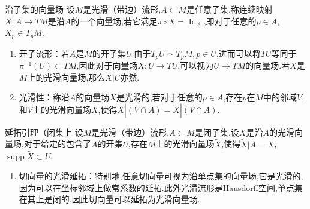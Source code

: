\documentclass[../../几何与拓扑.tex]{subfiles}
\begin{document}
\begin{definition}{沿子集的向量场}
    设$M$是光滑（带边）流形,$A\subset M$是任意子集.称连续映射$X:A\to TM$是沿$A$的一个向量场,若它满足$\pi \circ X=\operatorname{Id}_{A}$,即对于任意的$p \in A$,$X_{p} \in T_{p}M$.
\end{definition}

\begin{remark}
    \begin{enumerate}
        \item 开子流形：若$A$是$M$的开子集$U$.由于$T_{p}U\simeq T_{p}M,p \in U$,进而可以将$TU$等同于$\pi ^{-1}\left( U \right)\subset TM$,因此对于向量场$X:U\to TU$,可以视为$U\to TM$的向量场.若$X$是$M$上的光滑向量场,那么$X|U$亦然.
        \item 光滑性：称沿$A$的向量场$X$是光滑的,若对于任意的$p \in A$,存在$p$在$M$中的邻域$V$,和$V$上的光滑向量场$\tilde{X}$,使得$X|\left( V\cap A \right)=\tilde{X}|\left( V\cap A \right)$.
    \end{enumerate}
    
\end{remark}

\begin{lemma}{延拓引理（闭集上}
    设$M$是光滑（带边）流形,$A\subset M$是闭子集.设$X$是沿$A$的光滑向量场,对于给定的包含了$A$的开集$U$,存在$M$上的光滑向量场$\tilde{X}$,使得$\tilde{X}|A=X$,$\operatorname{supp}\tilde{X}\subset U$.
\end{lemma}

\begin{remark}
    \begin{enumerate}
        \item 切向量的光滑延拓：特别地,任意切向量可视为沿单点集的向量场,它是光滑的,因为可以在坐标邻域上做常系数的延拓.此外光滑流形是Hausdorff空间,单点集在其上是闭的,因此切向量可以延拓为光滑向量场.
    \end{enumerate}
    
\end{remark}
\end{document}
